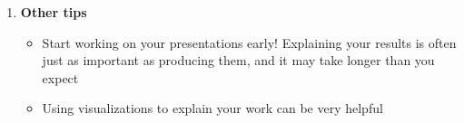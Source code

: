 \documentclass[12pt,letterpaper]{article}
\begin{document}
\begin{enumerate}[label=\textbf{(\alph*)}]
\item \textbf{Other tips}

\begin{itemize}
  \item Start working on your presentations early! Explaining your results is often just as important as producing them, and it may take longer than you expect
  \item Using visualizations to explain your work can be very helpful

\end{itemize}




\end{enumerate}
\end{document}
